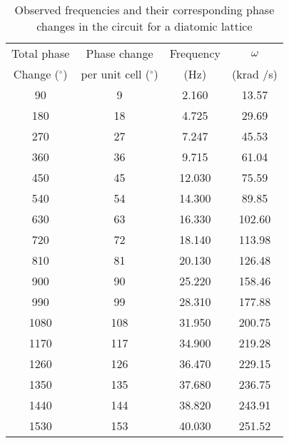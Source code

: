 \begin{table}[]
    \centering
    \begin{tabular}{|c|c|c|c|}
    \hline
    Total phase & Phase change & Frequency & $\omega$ \\
    Change  ($^\circ$) & per unit cell ($^\circ$) & (Hz) & (krad /s) \\ \hline
    90 & 9 & 2.160 & 13.57 \\ 
    180 & 18 & 4.725 & 29.69 \\ 
    270 & 27 & 7.247 & 45.53 \\ 
    360 & 36 & 9.715 & 61.04 \\ 
    450 & 45 & 12.030 & 75.59 \\ 
    540 & 54 & 14.300 & 89.85 \\ 
    630 & 63 & 16.330 & 102.60 \\ 
    720 & 72 & 18.140 & 113.98 \\ 
    810 & 81 & 20.130 & 126.48 \\ 
    900 & 90 & 25.220 & 158.46 \\ 
    990 & 99 & 28.310 & 177.88 \\ 
    1080 & 108 & 31.950 & 200.75 \\ 
    1170 & 117 & 34.900 & 219.28 \\ 
    1260 & 126 & 36.470 & 229.15 \\ 
    1350 & 135 & 37.680 & 236.75 \\ 
    1440 & 144 & 38.820 & 243.91 \\ 
    1530 & 153 & 40.030 & 251.52 \\ \hline
    \end{tabular}
    \caption{Observed frequencies and their corresponding phase changes in the circuit for a diatomic lattice}
    \label{tab:di1}
\end{table}